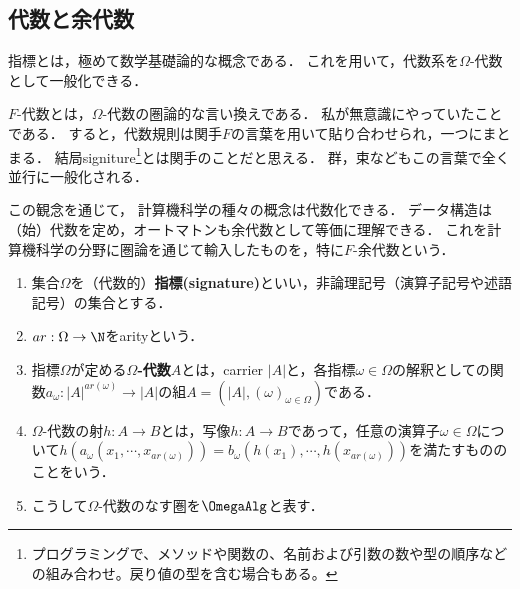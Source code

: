 \subsection{代数と余代数}

\begin{tcolorbox}[colframe=ForestGreen, colback=ForestGreen!10!white, breakable,
    title=signature]
    指標とは，極めて数学基礎論的な概念である．
    これを用いて，代数系を$\Omega$-代数として一般化できる．

    $F$-代数とは，$\Omega$-代数の圏論的な言い換えである．
    私が無意識にやっていたことである．
    すると，代数規則は関手$F$の言葉を用いて貼り合わせられ，一つにまとまる．
    結局signiture\footnote{プログラミングで、メソッドや関数の、名前および引数の数や型の順序などの組み合わせ。戻り値の型を含む場合もある。}とは関手のことだと思える．
    群，束などもこの言葉で全く並行に一般化される．

    この観念を通じて，
    計算機科学の種々の概念は代数化できる．
    データ構造は（始）代数を定め，オートマトンも余代数として等価に理解できる．
    これを計算機科学の分野に圏論を通じて輸入したものを，特に$F$-余代数という．
\end{tcolorbox}

\begin{definition}\mbox{}
    \begin{enumerate}
        \item 集合$\Omega$を（代数的）\textbf{指標(signature)}といい，非論理記号（演算子記号や述語記号）の集合とする．
        \item $ar:\Omega\to\N$をarityという．
        \item 指標$\Omega$が定める\textbf{$\Omega$-代数}$A$とは，carrier $|A|$と，各指標$\omega\in\Omega$の解釈としての関数$a_\omega:|A|^{ar(\omega)}\to|A|$の組$A=(|A|,(\omega)_{\omega\in\Omega})$である．
        \item $\Omega$-代数の射$h:A\to B$とは，写像$h:A\to B$であって，任意の演算子$\omega\in\Omega$について$h(a_\omega(x_1,\cdots,x_{ar(\omega)}))=b_\omega(h(x_1),\cdots,h(x_{ar(\omega)}))$を満たすもののことをいう．
        \item こうして$\Omega$-代数のなす圏を$\OmegaAlg$と表す．
    \end{enumerate}
\end{definition}

